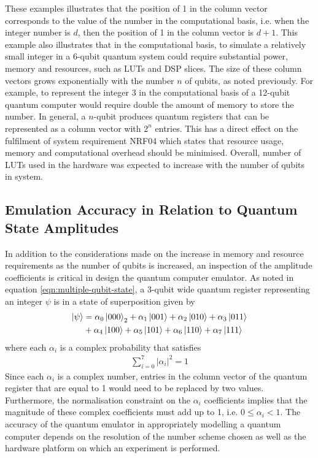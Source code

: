 These examples illustrates that the position of 1 in the column vector corresponds to the value of the number in the computational basis, i.e. when the integer number is $d$, then the position of 1 in the column vector is $d + 1$. This example also illustrates that in the computational basis, to simulate a relatively small integer in a 6-qubit quantum system could require substantial power, memory and resources, such as LUTs and DSP slices. The size of these column vectors grows exponentially with the number $n$ of qubits, as noted previously. For example, to represent the integer 3 in the computational basis of a 12-qubit quantum computer would require double the amount of memory to store the number. In general, a $n$-qubit produces quantum registers that can be represented as a column vector with $2^n$ entries. This has a direct effect on the fulfilment of system requirement NRF04 which states that resource usage, memory and computational overhead should be minimised. Overall, number of LUTs used in the hardware was expected to increase with the number of qubits in system.

\subsection{Emulation Accuracy in Relation to Quantum State Amplitudes}

In addition to the considerations made on the increase in memory and resource requirements as the number of qubits is increased, an inspection of the amplitude coefficients is critical in design the quantum computer emulator. As noted in equation \ref{eqn:multiple-qubit-state}, a 3-qubit wide quantum register representing an integer $\psi$ is in a state of superposition given by
\begin{align}
	\ket{\psi} & = \alpha_0 \ket{000}_2  + \alpha_1 \ket{001} + \alpha_2 \ket{010} + \alpha_3 \ket{011}\nonumber\\& + \alpha_4 \ket{100} + \alpha_5 \ket{101} + \alpha_6 \ket{110} + \alpha_7 \ket{111}\nonumber 
\end{align}
where each $\alpha_{i}$ is a complex probability that satisfies
\begin{align}
	\sum_{i=0}^{7}|\alpha_{i}|^{2} =  1\nonumber
\end{align} 
Since each $\alpha_{i}$ is a complex number, entries in the column vector of the quantum register that are equal to 1 would need to be replaced by two values. Furthermore, the normalisation constraint on the $\alpha_{i}$ coefficients implies that the magnitude of these complex coefficients must add up to 1, i.e. $0 \leq \alpha_{i} < 1$. The accuracy of the quantum emulator in appropriately modelling a quantum computer depends on the resolution of the number scheme chosen as well as the hardware platform on which an experiment is performed. 

